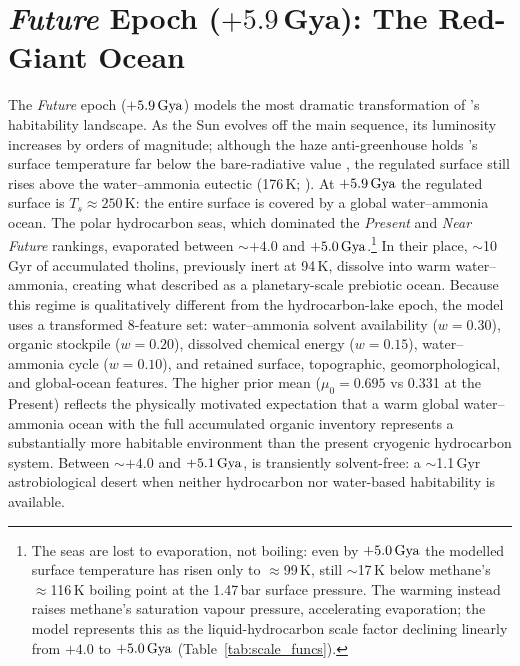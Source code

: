\section{\textit{Future} Epoch ($+5.9$\,Gya): The Red-Giant Ocean}
\label{sec:results_future}

The \textit{Future} epoch ($+5.9\,\text{Gya}$) models the most dramatic transformation of \titan{}'s habitability landscape.  As the Sun evolves off the main sequence, its luminosity increases by orders of magnitude; although the haze anti-greenhouse holds \titan{}'s surface temperature far below the bare-radiative value \citep{Lorenz1997}, the regulated surface still rises above the water--ammonia eutectic (176\,K; \citealt{Grasset2005}).  At $+5.9\,\text{Gya}$ the regulated surface is $T_s \approx 250$\,K: the entire surface is covered by a global water--ammonia ocean.  The polar hydrocarbon seas, which dominated the \textit{Present} and \textit{Near Future} rankings, evaporated between $\sim$$+4.0$ and $+5.0\,\text{Gya}$.\footnote{The seas are lost to evaporation, not boiling: even by $+5.0\,\text{Gya}$ the modelled surface temperature has risen only to $\approx$99\,K, still $\sim$17\,K below methane's $\approx$116\,K boiling point at the 1.47\,bar surface pressure.  The warming instead raises methane's saturation vapour pressure, accelerating evaporation; the model represents this as the liquid-hydrocarbon scale factor declining linearly from $+4.0$ to $+5.0\,\text{Gya}$ (Table~\ref{tab:scale_funcs}).}  In their place, $\sim$10\,Gyr of accumulated tholins, previously inert at 94\,K, dissolve into warm water--ammonia, creating what \citet{Lorenz1997} described as a planetary-scale prebiotic ocean.  Because this regime is qualitatively different from the hydrocarbon-lake epoch, the model uses a transformed 8-feature set: water--ammonia solvent availability ($w=0.30$), organic stockpile ($w=0.20$), dissolved chemical energy ($w=0.15$), water--ammonia cycle ($w=0.10$), and retained surface, topographic, geomorphological, and global-ocean features.  The higher prior mean ($\mu_0 = 0.695$ vs 0.331 at the Present) reflects the physically motivated expectation that a warm global water--ammonia ocean with the full accumulated organic inventory represents a substantially more habitable environment than the present cryogenic hydrocarbon system.  Between $\sim$$+4.0$ and $+5.1\,\text{Gya}$, \titan{} is transiently solvent-free: a $\sim$1.1\,Gyr astrobiological desert when neither hydrocarbon nor water-based habitability is available.

